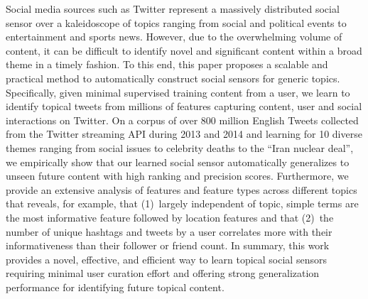 
Social media sources such as Twitter represent a massively distributed
social sensor over a kaleidoscope of topics ranging from social and
political events to entertainment and sports news.
However, due to the overwhelming volume of content, it can be
difficult to identify novel and significant content within a broad
theme in a timely fashion.
%
%
To this end, this paper proposes a scalable and practical method to
automatically construct social sensors for generic topics.
Specifically, given minimal supervised training content from a user, we learn 
to identify topical tweets 
from millions of features capturing content, user and social interactions on Twitter.
On a corpus of over 800 million English Tweets
collected from the Twitter
streaming API during 2013 and 2014 and learning for 10 diverse themes 
ranging from social issues to celebrity deaths to the ``Iran nuclear
deal'', we empirically show that our learned social sensor
automatically generalizes to unseen future content 
with high ranking and precision scores.  Furthermore, we provide an
extensive analysis of features and feature types across different
topics that reveals, for example, that (1)~largely independent of
topic, simple terms are the most informative feature followed by
location features and that (2)~the number of unique hashtags and
tweets by a user correlates more with their informativeness than their
follower or friend count.  In summary, this work provides a novel,
effective, and efficient way to learn topical social sensors requiring
minimal user curation effort and offering strong generalization performance
for identifying future topical content.

